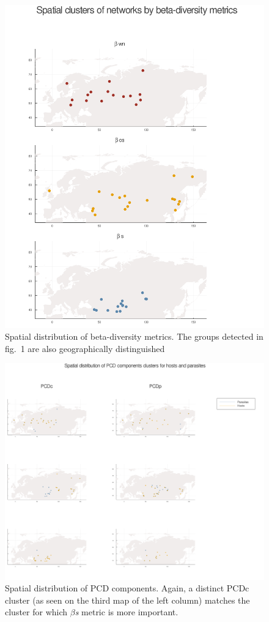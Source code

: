 \documentclass[12pt]{article}
\makeatletter
\def\maxwidth{\ifdim\Gin@nat@width>\linewidth\linewidth
\else\Gin@nat@width\fi}
\let\Oldincludegraphics\includegraphics
\renewcommand{\includegraphics}[1]{\Oldincludegraphics[width=\maxwidth]{#1}}
\makeatother
\begin{document}
\begin{figure}
\hypertarget{fig:threeA}{%
\centering
\includegraphics{figures/fig3A.png}
\caption{Spatial distribution of beta-diversity metrics. The groups
detected in fig.~1 are also geographically
distinguished}\label{fig:threeA}
}
\end{figure}

\begin{figure}
\hypertarget{fig:threeB}{%
\centering
\includegraphics{figures/fig3B.png}
\caption{Spatial distribution of PCD components. Again, a distinct PCDc
cluster (as seen on the third map of the left column) matches the
cluster for which \emph{\(\beta\)s} metric is more
important.}\label{fig:threeB}
}
\end{figure}
\end{document}
